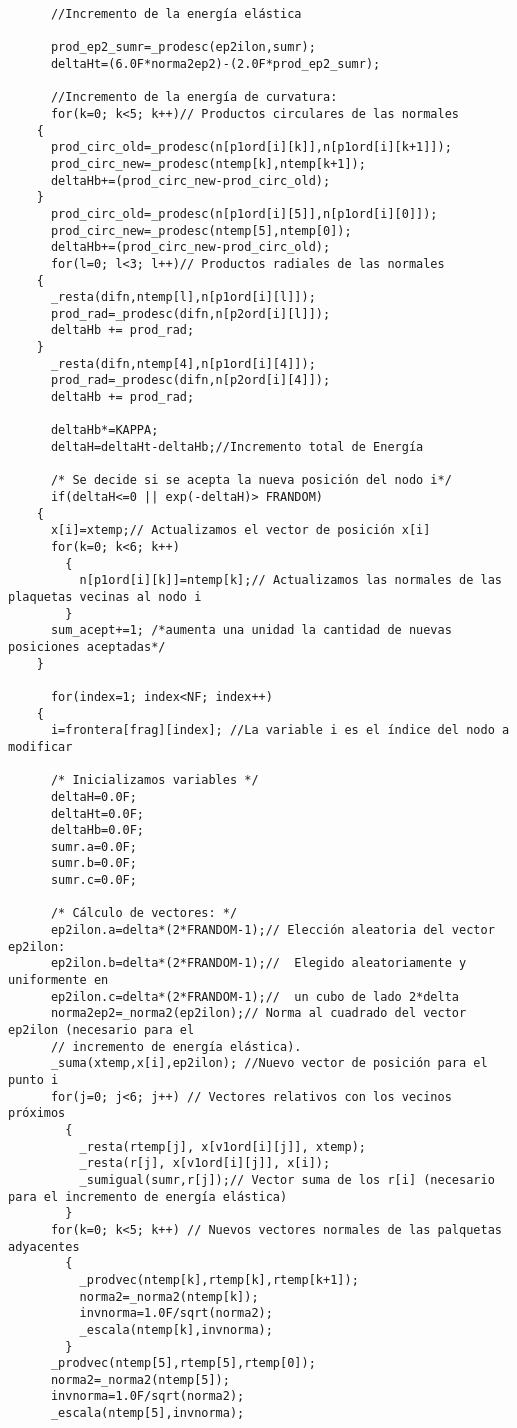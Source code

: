 \begin{verbatim}
      //Incremento de la energía elástica
     
      prod_ep2_sumr=_prodesc(ep2ilon,sumr);
      deltaHt=(6.0F*norma2ep2)-(2.0F*prod_ep2_sumr);

      //Incremento de la energía de curvatura:
      for(k=0; k<5; k++)// Productos circulares de las normales
	{
	  prod_circ_old=_prodesc(n[p1ord[i][k]],n[p1ord[i][k+1]]);
	  prod_circ_new=_prodesc(ntemp[k],ntemp[k+1]);
	  deltaHb+=(prod_circ_new-prod_circ_old);
	}
      prod_circ_old=_prodesc(n[p1ord[i][5]],n[p1ord[i][0]]);
      prod_circ_new=_prodesc(ntemp[5],ntemp[0]);
      deltaHb+=(prod_circ_new-prod_circ_old);
      for(l=0; l<3; l++)// Productos radiales de las normales
	{
	  _resta(difn,ntemp[l],n[p1ord[i][l]]);
	  prod_rad=_prodesc(difn,n[p2ord[i][l]]);
	  deltaHb += prod_rad;
	}
      _resta(difn,ntemp[4],n[p1ord[i][4]]);
      prod_rad=_prodesc(difn,n[p2ord[i][4]]);
      deltaHb += prod_rad;

      deltaHb*=KAPPA;
      deltaH=deltaHt-deltaHb;//Incremento total de Energía

      /* Se decide si se acepta la nueva posición del nodo i*/
      if(deltaH<=0 || exp(-deltaH)> FRANDOM)
	{
	  x[i]=xtemp;// Actualizamos el vector de posición x[i]
	  for(k=0; k<6; k++)
	    {
	      n[p1ord[i][k]]=ntemp[k];// Actualizamos las normales de las plaquetas vecinas al nodo i
	    }
	  sum_acept+=1; /*aumenta una unidad la cantidad de nuevas posiciones aceptadas*/
	}

      for(index=1; index<NF; index++)
	{
	  i=frontera[frag][index]; //La variable i es el índice del nodo a modificar

	  /* Inicializamos variables */
	  deltaH=0.0F;
	  deltaHt=0.0F;
	  deltaHb=0.0F;
	  sumr.a=0.0F;
	  sumr.b=0.0F;
	  sumr.c=0.0F;
	  
	  /* Cálculo de vectores: */      
	  ep2ilon.a=delta*(2*FRANDOM-1);// Elección aleatoria del vector ep2ilon:
	  ep2ilon.b=delta*(2*FRANDOM-1);//  Elegido aleatoriamente y uniformente en   
	  ep2ilon.c=delta*(2*FRANDOM-1);//  un cubo de lado 2*delta
	  norma2ep2=_norma2(ep2ilon);// Norma al cuadrado del vector ep2ilon (necesario para el 
	  // incremento de energía elástica).
	  _suma(xtemp,x[i],ep2ilon); //Nuevo vector de posición para el punto i
	  for(j=0; j<6; j++) // Vectores relativos con los vecinos próximos
	    {
	      _resta(rtemp[j], x[v1ord[i][j]], xtemp);
	      _resta(r[j], x[v1ord[i][j]], x[i]); 
	      _sumigual(sumr,r[j]);// Vector suma de los r[i] (necesario para el incremento de energía elástica)
	    }
	  for(k=0; k<5; k++) // Nuevos vectores normales de las palquetas adyacentes
	    {
	      _prodvec(ntemp[k],rtemp[k],rtemp[k+1]);
	      norma2=_norma2(ntemp[k]);
	      invnorma=1.0F/sqrt(norma2);
	      _escala(ntemp[k],invnorma);
	    }
	  _prodvec(ntemp[5],rtemp[5],rtemp[0]);
	  norma2=_norma2(ntemp[5]);
	  invnorma=1.0F/sqrt(norma2);
	  _escala(ntemp[5],invnorma);
	  

\end{verbatim}

